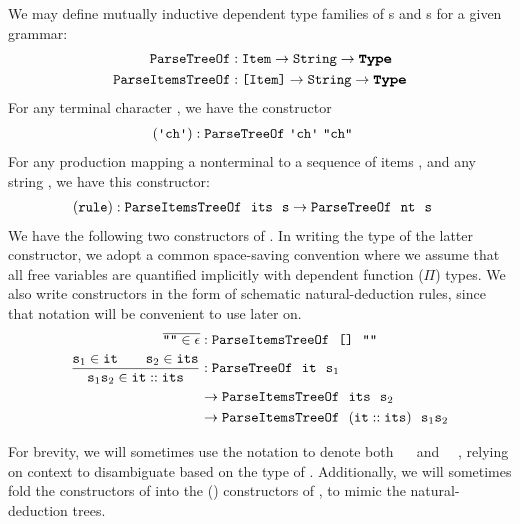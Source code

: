     We may define mutually inductive dependent type families of s and s for a given grammar:
    \begin{align*}
      \indname{ParseTreeOf} & \oftypesep \indname{Item} \typeto \String \typeto \Type \\
      \indname{ParseItemsTreeOf} & \oftypesep \typelist{\indname{Item}} \typeto \String \typeto \Type
    \end{align*}
    For any terminal character , we have the constructor
    \begin{align*}
      (\terminal{\farg{ch}}) & \oftypesep \indname{ParseTreeOf}~\terminal{\farg{ch}}~\str{\farg{ch}}
    \end{align*}
    For any production  mapping a nonterminal  to a sequence of items , and any string , we have this constructor:
    \begin{align*}
      & (\texttt{rule}) : \texttt{ParseItemsTreeOf}~~\texttt{its}~~\texttt{s} \to \texttt{ParseTreeOf}~~\texttt{nt}~~\texttt{s}
    \end{align*}
    We have the following two constructors of .  In writing the type of the latter constructor, we adopt a common space-saving convention where we assume that all free variables are quantified implicitly with dependent function ($\Pi$) types.  We also write constructors in the form of schematic natural-deduction rules, since that notation will be convenient to use later on.
    \begin{align*}
      \overline{\texttt{"}\texttt{}\texttt{"}\in\epsilon} & : \texttt{ParseItemsTreeOf}~~\texttt{[]}~~\texttt{"}\texttt{}\texttt{"} \\
      \frac{\texttt{s$_1$}\in \texttt{it}\qquad \texttt{s$_2$}\in \texttt{its}}{\texttt{s$_1$}\texttt{s$_2$}\in \texttt{it}::\texttt{its}} & : \texttt{ParseTreeOf}~~\texttt{it}~~\texttt{s$_1$} \\
      & \to \texttt{ParseItemsTreeOf}~~\texttt{its}~~\texttt{s$_2$} \\
      & \to
      \texttt{ParseItemsTreeOf}~~(\texttt{it}::\texttt{its})~~\texttt{s$_1$}\texttt{s$_2$}
    \end{align*}

    For brevity, we will sometimes use the notation  to denote both ~~ and ~~, relying on context to disambiguate based on the type of .  Additionally, we will sometimes fold the constructors of  into the () constructors of , to mimic the natural-deduction trees.

